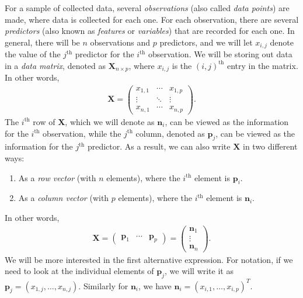 \documentclass[10pt]{article}
\newcommand{\mydef}[1]{\textcolor{SteelBlue3}{\textit{#1}}} %
\begin{document}
For a sample of collected data, several \mydef{observations} (also called \mydef{data points}) are made, where data is collected for each one. For each observation, there are several  \mydef{predictors} (also known as \mydef{features} or \mydef{variables}) that are recorded for each one. In general, there will be $n$ observations and $p$ predictors, and we will let $x_{i,j}$ denote the value of the $j^{\text{th}}$ predictor for the $i^{\text{th}}$ observation. We will be storing out data in a \mydef{data matrix}, denoted as $\mathbf{X}_{n \times p}$, where $x_{i,j}$ is the $(i,j)^{\text{th}}$ entry in the matrix. In other words, 
\begin{align}
    \label{datamatrix}
    \mathbf{X} = \begin{pmatrix}
        x_{1,1} & \cdots & x_{1,p} \\
        \vdots & \ddots & \vdots \\
        x_{n,1} & \cdots & x_{n,p}
    \end{pmatrix}.
\end{align}
The $i^{\text{th}}$ row of $\mathbf{X}$, which we will denote as $\mathbf{n}_i$, can be viewed as the information for the $i^{\text{th}}$ observation, while the $j^{\text{th}}$ column, denoted as $\mathbf{p}_j$, can be viewed as the information for the $j^{\text{th}}$ predictor. As a result, we can also write $\mathbf{X}$ in two different ways:
\begin{enumerate}
    \item As a \textit{row vector} (with $n$ elements), where the $i^{\text{th}}$ element is $\mathbf{p}_i$.
    \item As a \textit{column vector} (with $p$ elements), where the $i^{\text{th}}$ element is $\mathbf{n}_i$.
\end{enumerate}
In other words, 
\begin{align}
    \label{datamatrixasvector}
    \mathbf{X} = \begin{pmatrix}
        \mathbf{p}_1 & \cdots & \mathbf{p}_p
    \end{pmatrix} = \begin{pmatrix}
        \mathbf{n}_1 \\ \vdots \\ \mathbf{n}_n
    \end{pmatrix}.
\end{align}
We will be more interested in the first alternative expression. For notation, if we need to look at the individual elements of $\mathbf{p}_j$, we will write it as $\mathbf{p}_j = (x_{1,j},\ldots,x_{n,j})$. Similarly for $\mathbf{n}_i$, we have $\mathbf{n}_i = (x_{i,1},\ldots,x_{i,p})^T$.
\end{document}
